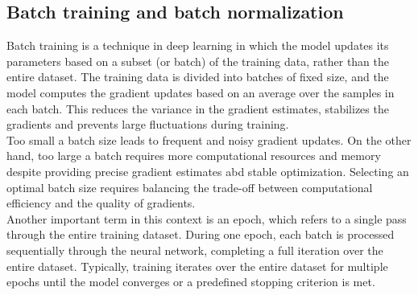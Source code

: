 \subsection{Batch training and batch normalization}
Batch training is a technique in deep learning in which the model updates its parameters based on a subset (or batch) of the training data, rather than the entire dataset. The training data is divided into batches of fixed size, and the model computes the gradient updates based on an average over the samples in each batch. This reduces the variance in the gradient estimates, stabilizes the gradients and prevents large fluctuations during training. \\
Too small a batch size leads to frequent and noisy gradient updates. On the other hand, too large a batch requires more computational resources and memory despite providing precise gradient estimates abd stable optimization. Selecting an optimal batch size requires balancing the trade-off between computational efficiency and the quality of gradients. \\                     
Another important term in this context is an epoch, which refers to a single pass through the entire training dataset. During one epoch, each batch is processed sequentially through the neural network, completing a full iteration over the entire dataset. Typically, training iterates over the entire dataset for multiple epochs until the model converges or a predefined stopping criterion is met. \\


